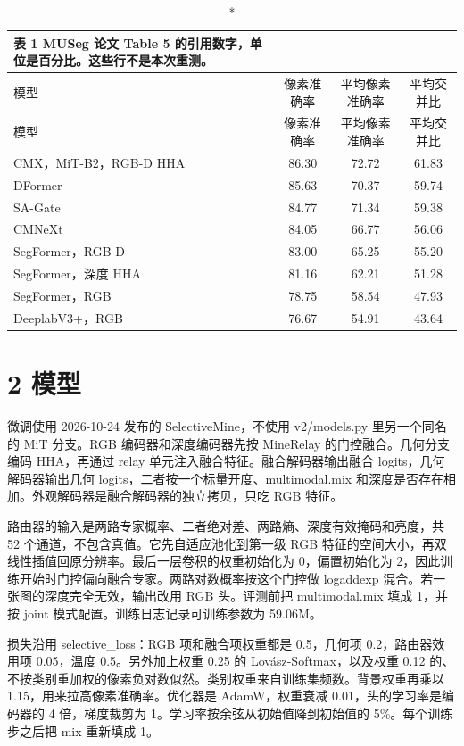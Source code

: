 \documentclass[11pt]{article}
\begin{document}
{\footnotesize\setlength{\tabcolsep}{3pt}
\begin{longtable}{lccc}
\caption*{表 1  MUSeg 论文 Table 5 的引用数字，单位是百分比。这些行不是本次重测。}\\
\toprule
模型 & 像素准确率 & 平均像素准确率 & 平均交并比\\
\midrule
\endfirsthead
\toprule
模型 & 像素准确率 & 平均像素准确率 & 平均交并比\\
\midrule
\endhead
CMX，MiT-B2，RGB-D HHA & 86.30 & 72.72 & 61.83\\
DFormer & 85.63 & 70.37 & 59.74\\
SA-Gate & 84.77 & 71.34 & 59.38\\
CMNeXt & 84.05 & 66.77 & 56.06\\
SegFormer，RGB-D & 83.00 & 65.25 & 55.20\\
SegFormer，深度 HHA & 81.16 & 62.21 & 51.28\\
SegFormer，RGB & 78.75 & 58.54 & 47.93\\
DeeplabV3+，RGB & 76.67 & 54.91 & 43.64\\
\bottomrule
\end{longtable}
}
\section*{2  模型}
微调使用 2026-10-24 发布的 SelectiveMine，不使用 v2/models.py 里另一个同名的 MiT 分支。RGB 编码器和深度编码器先按 MineRelay 的门控融合。几何分支编码 HHA，再通过 relay 单元注入融合特征。融合解码器输出融合 logits，几何解码器输出几何 logits，二者按一个标量开度、multimodal.mix 和深度是否存在相加。外观解码器是融合解码器的独立拷贝，只吃 RGB 特征。

路由器的输入是两路专家概率、二者绝对差、两路熵、深度有效掩码和亮度，共 52 个通道，不包含真值。它先自适应池化到第一级 RGB 特征的空间大小，再双线性插值回原分辨率。最后一层卷积的权重初始化为 0，偏置初始化为 2，因此训练开始时门控偏向融合专家。两路对数概率按这个门控做 logaddexp 混合。若一张图的深度完全无效，输出改用 RGB 头。评测前把 multimodal.mix 填成 1，并按 joint 模式配置。训练日志记录可训练参数为 59.06M。

损失沿用 selective\_loss：RGB 项和融合项权重都是 0.5，几何项 0.2，路由器效用项 0.05，温度 0.5。另外加上权重 0.25 的 Lovász-Softmax，以及权重 0.12 的、不按类别重加权的像素负对数似然。类别权重来自训练集频数。背景权重再乘以 1.15，用来拉高像素准确率。优化器是 AdamW，权重衰减 0.01，头的学习率是编码器的 4 倍，梯度裁剪为 1。学习率按余弦从初始值降到初始值的 5\%。每个训练步之后把 mix 重新填成 1。
\end{document}
